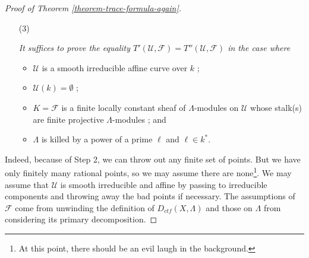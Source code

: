 \begin{proof}[Proof of Theorem \ref{theorem-trace-formula-again}]
$$$$
\begin{enumerate}
\item[(3)]
{\it It suffices to prove the equality $T'(\mathcal{U}, \mathcal{F}) =
T''(\mathcal{U}, \mathcal{F})$ in the case where
\begin{itemize}
\item $\mathcal{U}$ is a smooth irreducible affine curve over $k$ ;
\item $\mathcal{U}(k) = \emptyset$ ;
\item $K=\mathcal{F}$ is a finite locally constant sheaf of $\Lambda$-modules
on $\mathcal{U}$ whose stalk(s) are finite projective $\Lambda$-modules ; and
\item $\Lambda$ is killed by a power of a prime $\ell$ and $\ell \in k^*$.
\end{itemize}
}
\end{enumerate}
Indeed, because of Step 2, we can throw out any finite set of points. But we
have only finitely many rational points, so we may assume there are
none\footnote{At this point, there should be an evil laugh in the background.}.
We may assume that $\mathcal{U}$ is smooth irreducible and affine by passing to
irreducible components and throwing away the bad points if necessary. The
assumptions of $\mathcal{F}$ come from unwinding the definition of
$D_{ctf}(X, \Lambda)$ and those on $\Lambda$ from considering its primary
decomposition.


\end{proof}
